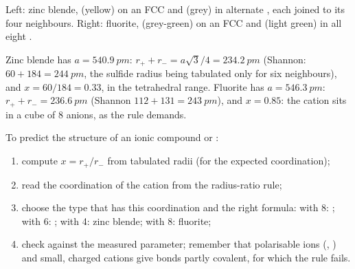 \begin{omfigure}

{\small Left: zinc blende,  (yellow) on an FCC  and
 (grey) in alternate , each joined to its
four neighbours. Right: fluorite,  (grey-green) on an FCC
 and  (light green) in all eight .}
\end{omfigure}

\begin{example}\label{ex:b1:crystals-ionic-covalent:zns}
Zinc blende has $a = \qty{540.9}{pm}$: $r_+ + r_- = a\sqrt3/4 =
\qty{234.2}{pm}$ (Shannon: $60 + 184 = \qty{244}{pm}$, the sulfide radius
being tabulated only for six neighbours), and $x = 60/184 = 0.33$, in the
tetrahedral range. Fluorite has $a = \qty{546.3}{pm}$: $r_+ + r_- =
\qty{236.6}{pm}$ (Shannon $112 + 131 = \qty{243}{pm}$), and $x = 0.85$:
the cation sits in a cube of 8 anions, as the rule demands.
\end{example}

\begin{method}\label{met:b1:crystals-ionic-covalent:predict}
To predict the structure of an ionic compound  or :
\begin{enumerate}
  \item compute $x = r_+/r_-$ from tabulated radii (for the expected
        coordination);
  \item read the coordination of the cation from the radius-ratio rule;
  \item choose the type that has this coordination and the right formula:
         with 8: ; with 6: ; with 4: zinc blende;
         with 8: fluorite;
  \item check against the measured  parameter; remember that
        polarisable ions (, ) and small, charged cations
        give bonds partly covalent, for which the rule fails.
\end{enumerate}
\end{method}

